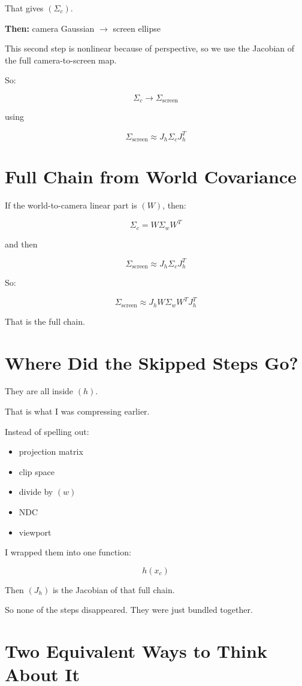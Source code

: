 \documentclass[11pt,letterpaper]{article}
\begin{document}
That gives $(\Sigma_c)$.

\textbf{Then:} camera Gaussian $\to$ screen ellipse

This second step is nonlinear because of perspective, so we use the Jacobian of the full camera-to-screen map.

So:

\[
\Sigma_c \to \Sigma_{\text{screen}}
\]

using

\[
\Sigma_{\text{screen}} \approx J_h \Sigma_c J_h^T
\]

\section{Full Chain from World Covariance}

If the world-to-camera linear part is $(W)$, then:

\[
\Sigma_c = W \Sigma_w W^T
\]

and then

\[
\Sigma_{\text{screen}} \approx J_h \Sigma_c J_h^T
\]

So:

\[
\Sigma_{\text{screen}} \approx J_h W \Sigma_w W^T J_h^T
\]

That is the full chain.

\section{Where Did the Skipped Steps Go?}

They are all inside $(h)$.

That is what I was compressing earlier.

Instead of spelling out:

\begin{itemize}
\item projection matrix
\item clip space
\item divide by $(w)$
\item NDC
\item viewport
\end{itemize}

I wrapped them into one function:

\[
h(x_c)
\]

Then $(J_h)$ is the Jacobian of that full chain.

So none of the steps disappeared. They were just bundled together.

\section{Two Equivalent Ways to Think About It}
\end{document}
